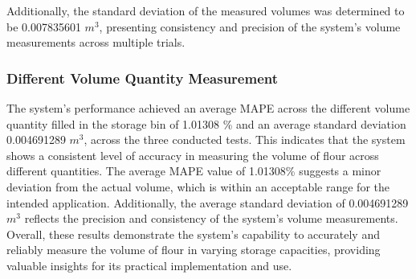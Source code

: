 Additionally, the standard deviation of the measured volumes was determined to be 0.007835601 $m^{3}$, presenting consistency and precision of the system's volume measurements across multiple trials.

\subsubsection{Different Volume Quantity Measurement}

The system's performance achieved an average MAPE across the different volume quantity filled in the storage bin of 1.01308 \% and an average standard deviation 0.004691289 $m^3$, across the three conducted tests. This indicates that the system shows a consistent level of accuracy in measuring the volume of flour across different quantities. The average MAPE value of 1.01308\% suggests a minor deviation from the actual volume, which is within an acceptable range for the intended application. Additionally, the average standard deviation of 0.004691289 $m^3$ reflects the precision and consistency of the system's volume measurements. Overall, these results demonstrate the system's capability to accurately and reliably measure the volume of flour in varying storage capacities, providing valuable insights for its practical implementation and use.




